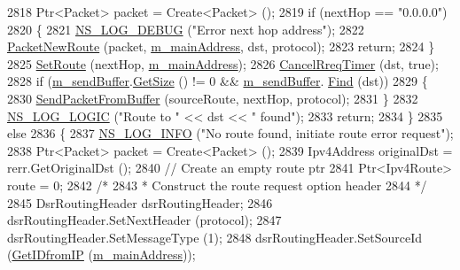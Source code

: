 \begin{DoxyCode}
2818       Ptr<Packet> packet = Create<Packet> ();
2819       \textcolor{keywordflow}{if} (nextHop == \textcolor{stringliteral}{"0.0.0.0"})
2820         \{
2821           \hyperlink{group__logging_ga413f1886406d49f59a6a0a89b77b4d0a}{NS\_LOG\_DEBUG} (\textcolor{stringliteral}{"Error next hop address"});
2822           \hyperlink{classns3_1_1dsr_1_1DsrRouting_ae70ab39db551d1d81afc081196f78017}{PacketNewRoute} (packet, \hyperlink{classns3_1_1dsr_1_1DsrRouting_a73182b5edee2d8460f28855e058fc9a0}{m\_mainAddress}, dst, protocol);
2823           \textcolor{keywordflow}{return};
2824         \}
2825       \hyperlink{classns3_1_1dsr_1_1DsrRouting_a8a726fb52558a1a8172a5bd5b8cdb072}{SetRoute} (nextHop, \hyperlink{classns3_1_1dsr_1_1DsrRouting_a73182b5edee2d8460f28855e058fc9a0}{m\_mainAddress});
2826       \hyperlink{classns3_1_1dsr_1_1DsrRouting_ad489fa602b093c8336cf4143ed60e429}{CancelRreqTimer} (dst, \textcolor{keyword}{true});
2828       \textcolor{keywordflow}{if} (\hyperlink{classns3_1_1dsr_1_1DsrRouting_a887ae39d7060171753c0605d5c120549}{m\_sendBuffer}.\hyperlink{classns3_1_1dsr_1_1DsrSendBuffer_a0ecf75786eef7193fa5a5d84b2b7a1f0}{GetSize} () != 0 && \hyperlink{classns3_1_1dsr_1_1DsrRouting_a887ae39d7060171753c0605d5c120549}{m\_sendBuffer}.
      \hyperlink{classns3_1_1dsr_1_1DsrSendBuffer_acf27d9e92a1d1960b9094c4108724a53}{Find} (dst))
2829         \{
2830           \hyperlink{classns3_1_1dsr_1_1DsrRouting_a1a862a16f3a5527f9425763864ac3e80}{SendPacketFromBuffer} (sourceRoute, nextHop, protocol);
2831         \}
2832       \hyperlink{group__logging_ga88acd260151caf2db9c0fc84997f45ce}{NS\_LOG\_LOGIC} (\textcolor{stringliteral}{"Route to "} << dst << \textcolor{stringliteral}{" found"});
2833       \textcolor{keywordflow}{return};
2834     \}
2835   \textcolor{keywordflow}{else}
2836     \{
2837       \hyperlink{group__logging_gafbd73ee2cf9f26b319f49086d8e860fb}{NS\_LOG\_INFO} (\textcolor{stringliteral}{"No route found, initiate route error request"});
2838       Ptr<Packet> packet = Create<Packet> ();
2839       Ipv4Address originalDst = rerr.GetOriginalDst ();
2840       \textcolor{comment}{// Create an empty route ptr}
2841       Ptr<Ipv4Route> route = 0;
2842       \textcolor{comment}{/*}
2843 \textcolor{comment}{       * Construct the route request option header}
2844 \textcolor{comment}{       */}
2845       DsrRoutingHeader dsrRoutingHeader;
2846       dsrRoutingHeader.SetNextHeader (protocol);
2847       dsrRoutingHeader.SetMessageType (1);
2848       dsrRoutingHeader.SetSourceId (\hyperlink{classns3_1_1dsr_1_1DsrRouting_a4593e50d5f36e9b9b013fe0422067c44}{GetIDfromIP} (\hyperlink{classns3_1_1dsr_1_1DsrRouting_a73182b5edee2d8460f28855e058fc9a0}{m\_mainAddress}));

\end{DoxyCode}
